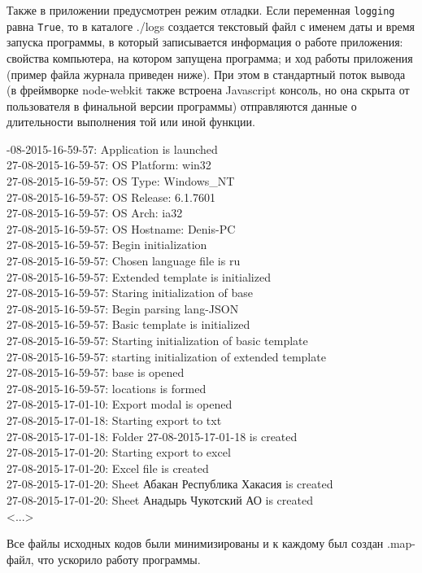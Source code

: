 Также в приложении предусмотрен режим отладки. Если переменная \texttt{logging} равна \texttt{True}, то в каталоге ./logs создается текстовый файл с именем даты и время запуска программы, в который записывается информация о работе приложения: свойства компьютера, на котором запущена программа; и ход работы приложения (пример файла журнала приведен ниже). При этом в стандартный поток вывода (в фреймворке node-webkit также встроена Javascript консоль, но она скрыта от пользователя в финальной версии программы) отправляются данные о длительности выполнения той или иной функции.

\begin{framed}
	-08-2015-16-59-57: Application is launched \\
	27-08-2015-16-59-57: OS Platform: win32 \\
	27-08-2015-16-59-57: OS Type: Windows\_NT \\
	27-08-2015-16-59-57: OS Release: 6.1.7601 \\
	27-08-2015-16-59-57: OS Arch: ia32 \\
	27-08-2015-16-59-57: OS Hostname: Denis-PC \\
	27-08-2015-16-59-57: Begin initialization \\
	27-08-2015-16-59-57: Chosen language file is ru \\
	27-08-2015-16-59-57: Extended template is initialized \\
	27-08-2015-16-59-57: Staring initialization of base \\
	27-08-2015-16-59-57: Begin parsing lang-JSON \\
	27-08-2015-16-59-57: Basic template is initialized \\
	27-08-2015-16-59-57: Starting initialization of basic template \\
	27-08-2015-16-59-57: starting initialization of extended template \\
	27-08-2015-16-59-57: base is opened \\
	27-08-2015-16-59-57: locations is formed \\
	27-08-2015-17-01-10: Export modal is opened \\
	27-08-2015-17-01-18: Starting export to txt  \\
	27-08-2015-17-01-18: Folder 27-08-2015-17-01-18 is created  \\
	27-08-2015-17-01-20: Starting export to excel  \\
	27-08-2015-17-01-20: Excel file is created  \\
	27-08-2015-17-01-20: Sheet Абакан  Республика Хакасия is created  \\
	27-08-2015-17-01-20: Sheet Анадырь  Чукотский АО is created \\
	<...>
\end{framed}

Все файлы исходных кодов были минимизированы и к каждому был создан .map-файл, что ускорило работу программы.



